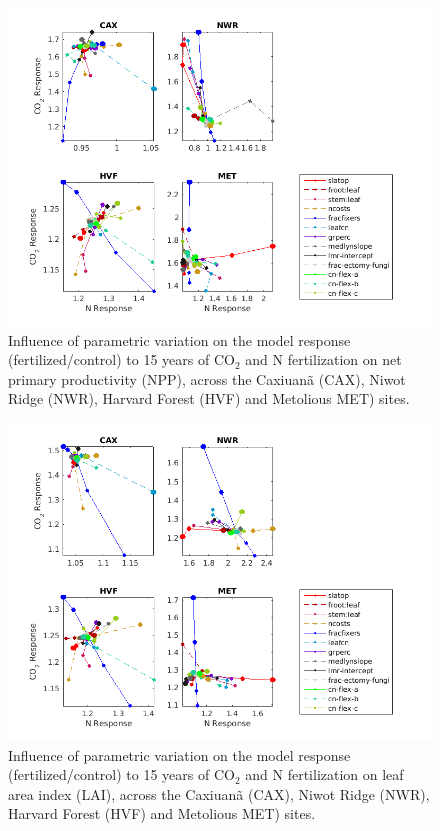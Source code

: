 \documentclass[draft,linenumbers]{agujournal}
\begin{document}
 \begin{figure}[h]
     \includegraphics[width=1.35\textwidth]{matlab/figures/NOVc_CNdep_NPP1__p2012.png}
     \caption{Influence of parametric variation on the model response (fertilized/control) to 15 years of CO$_{2}$ and N fertilization on net primary productivity (NPP), across the Caxiuan\~a (CAX), Niwot Ridge (NWR), Harvard Forest (HVF) and Metolious MET) sites.}
     \label{NPP CO2 and N respones 2001}
  \end{figure}
 
  \begin{figure}[h]
     \includegraphics[width=1.35\textwidth]{matlab/figures/NOVc_CNdep_TLAI1__p2012.png}
     \caption{Influence of parametric variation on the model response (fertilized/control) to 15 years of CO$_{2}$ and N fertilization on leaf area index (LAI), across the Caxiuan\~a (CAX), Niwot Ridge (NWR), Harvard Forest (HVF) and Metolious MET) sites.}
     \label{LAI CO2 and N respones 2001}
  \end{figure}
\end{document}
